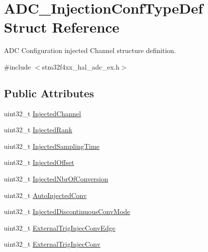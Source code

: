 \hypertarget{struct_a_d_c___injection_conf_type_def}{}\section{A\+D\+C\+\_\+\+Injection\+Conf\+Type\+Def Struct Reference}
\label{struct_a_d_c___injection_conf_type_def}


A\+DC Configuration injected Channel structure definition.  




{\ttfamily \#include $<$stm32f4xx\+\_\+hal\+\_\+adc\+\_\+ex.\+h$>$}

\subsection*{Public Attributes}
\begin{DoxyCompactItemize}
\item 
uint32\+\_\+t \hyperlink{struct_a_d_c___injection_conf_type_def_aad0cab6ed3f66e8ffa4bd0490298b715}{Injected\+Channel}
\item 
uint32\+\_\+t \hyperlink{struct_a_d_c___injection_conf_type_def_af8a1717c0f5a5d0c7a705224f28a844f}{Injected\+Rank}
\item 
uint32\+\_\+t \hyperlink{struct_a_d_c___injection_conf_type_def_a3d15c0590dbafc9e99e21ea4df5b0c6b}{Injected\+Sampling\+Time}
\item 
uint32\+\_\+t \hyperlink{struct_a_d_c___injection_conf_type_def_ac7d28d71ec3aec4d1587ee04fc585f09}{Injected\+Offset}
\item 
uint32\+\_\+t \hyperlink{struct_a_d_c___injection_conf_type_def_ac59f9795b1b8c4ce6745d99f8231b768}{Injected\+Nbr\+Of\+Conversion}
\item 
uint32\+\_\+t \hyperlink{struct_a_d_c___injection_conf_type_def_ab0e74342214a5610e6b4f1f080f10544}{Auto\+Injected\+Conv}
\item 
uint32\+\_\+t \hyperlink{struct_a_d_c___injection_conf_type_def_adf871acec9ab869d14b5d58e1549739b}{Injected\+Discontinuous\+Conv\+Mode}
\item 
uint32\+\_\+t \hyperlink{struct_a_d_c___injection_conf_type_def_a4f2cfa808b5ace1e47fc3f94da7b850f}{External\+Trig\+Injec\+Conv\+Edge}
\item 
uint32\+\_\+t \hyperlink{struct_a_d_c___injection_conf_type_def_ac3431d4d3e3089f0db271bfb06dbffc0}{External\+Trig\+Injec\+Conv}
\end{DoxyCompactItemize}


